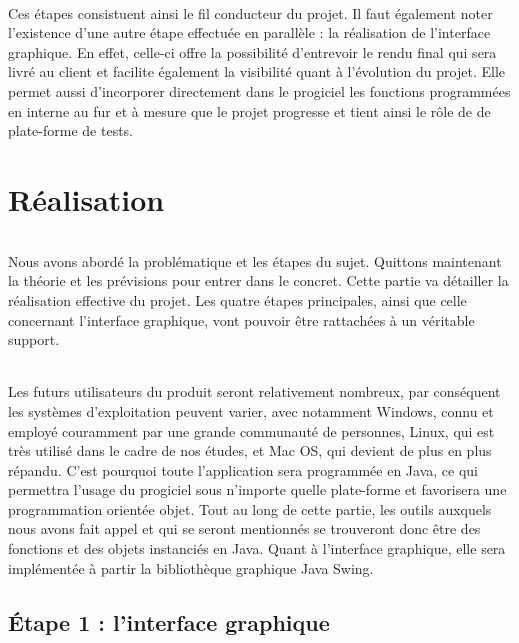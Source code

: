 \documentclass[a4paper,10pt]{report}
\begin{document}
	\paragraph{}
	  Ces étapes consistuent ainsi le fil conducteur du projet. 
	  Il faut également noter l'existence d'une autre étape effectuée en parallèle : la réalisation de l'interface graphique.
	  En effet, celle-ci offre la possibilité d'entrevoir le rendu final qui sera livré au client et facilite également la visibilité quant à l'évolution du projet.
	  Elle permet aussi d'incorporer directement dans le progiciel les fonctions programmées en interne au fur et à mesure que le projet progresse et tient ainsi le rôle de de plate-forme de tests.   
	
\part{Réalisation}
  \setcounter{chapter}{0}
  
	\paragraph{}
	  Nous avons abordé la problématique et les étapes du sujet.
	  Quittons maintenant la théorie et les prévisions pour entrer dans le concret.
	  Cette partie va détailler la réalisation effective du projet.
	  Les quatre étapes principales, ainsi que celle concernant l'interface graphique, vont pouvoir être rattachées à un véritable support.
	  
	\paragraph{}
	  Les futurs utilisateurs du produit seront relativement nombreux, par conséquent les systèmes d'exploitation peuvent varier, avec notamment Windows, connu et employé couramment par une grande communauté de personnes, Linux, qui est très utilisé dans le cadre de nos études, et Mac OS, qui devient de plus en plus répandu.
	  C'est pourquoi toute l'application sera programmée en Java, ce qui permettra l'usage du progiciel sous n'importe quelle plate-forme et favorisera une programmation orientée objet.
	  Tout au long de cette partie, les outils auxquels nous avons fait appel et qui se seront mentionnés se trouveront donc être des fonctions et des objets instanciés en Java.
	  Quant à l'interface graphique, elle sera implémentée à partir la bibliothèque graphique Java Swing.
  
  
  \chapter{Étape 1 : l'interface graphique}
\end{document}
